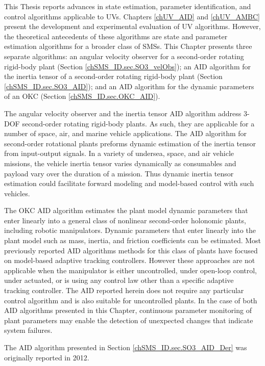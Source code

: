 
This Thesis reports advances in state estimation, parameter
identification, and control algorithms applicable to \acfp{UV}.
Chapters \ref{chUV_AID} and \ref{chUV_AMBC} present the development
and experimental evaluation of \ac{UV} algorithms.  However, the
theoretical antecedents of these algorithms are state and parameter
estimation algorithms for a broader class of \acfp{SMS}.  This
Chapter presents three separate algorithms: an angular velocity
observer for a second-order rotating rigid-body plant (Section
\ref{chSMS_ID.sec.SO3_velObs}); an \acl{AID} algorithm for the inertia
tensor of a second-order rotating rigid-body plant (Section
\ref{chSMS_ID.sec.SO3_AID}); and an \acl{AID} algorithm for the
dynamic parameters of an \ac{OKC} (Section
\ref{chSMS_ID.sec.OKC_AID}).



The angular velocity observer and the inertia tensor \ac{AID}
algorithm address 3-\ac{DOF} second-order rotating rigid-body plants.
%
As such, they are applicable for a number of space, air,
and marine vehicle applications.
%
The \ac{AID} algorithm for second-order rotational
plants preforms dynamic estimation of the inertia tensor from
input-output signals.
%
In a variety of undersea, space, and air vehicle missions, the vehicle
inertia tensor varies dynamically as consumables and payload vary over
the duration of a mission.  Thus dynamic inertia tensor estimation
could facilitate forward modeling and model-based control with such
vehicles.
%




The \ac{OKC} \ac{AID} algorithm estimates the plant model dynamic
parameters that enter linearly into a general class of nonlinear
second-order holonomic plants, including robotic manipulators.
%
Dynamic parameters that enter linearly into the plant model such as
mass, inertia, and friction coefficients can be estimated.  
%
Most previously reported \ac{AID} algorithms methods for this
class of plants have focused on model-based adaptive tracking
controllers.
%
However these approaches are not applicable when the manipulator is
either uncontrolled, under open-loop control, under actuated, or is
using any control law other than a specific adaptive tracking
controller.
%
The \ac{AID} reported herein does not require any
particular control algorithm and is also suitable for uncontrolled
plants.
%
In the case of both \ac{AID} algorithms presented in
this Chapter, continuous parameter monitoring of plant parameters may
enable the detection of unexpected changes that indicate system
failures.




The \ac{AID} algorithm presented in Section
\ref{chSMS_ID.sec.SO3_AID_Der} was originally reported in 2012\cite{mcfarland2012}.
